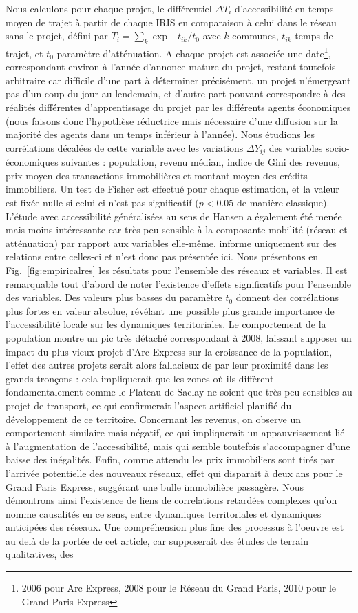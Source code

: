 {}{
Nous calculons pour chaque projet, le différentiel $\Delta T_i$ d'accessibilité en temps moyen de trajet à partir de chaque IRIS en comparaison à celui dans le réseau sans le projet, défini par $T_i = \sum_k \exp{-t_{ik}/t_0}$ avec $k$ communes, $t_{ik}$ temps de trajet, et $t_0$ paramètre d'atténuation. A chaque projet est associée une date\footnote{2006 pour Arc Express, 2008 pour le Réseau du Grand Paris, 2010 pour le Grand Paris Express}, correspondant environ à l'année d'annonce mature du projet, restant toutefois arbitraire car difficile d'une part à déterminer précisément, un projet n'émergeant pas d'un coup du jour au lendemain, et d'autre part pouvant correspondre à des réalités différentes d'apprentissage du projet par les différents agents économiques (nous faisons donc l'hypothèse réductrice mais nécessaire d'une diffusion sur la majorité des agents dans un temps inférieur à l'année). Nous étudions les corrélations décalées de cette variable avec les variations $\Delta Y_{ij}$ des variables socio-économiques suivantes : population, revenu médian, indice de Gini des revenus, prix moyen des transactions immobilières et montant moyen des crédits immobiliers. Un test de Fisher est effectué pour chaque estimation, et la valeur est fixée nulle si celui-ci n'est pas significatif ($p<0.05$ de manière classique). L'étude avec accessibilité généralisées au sens de Hansen a également été menée mais moins intéressante car très peu sensible à la composante mobilité (réseau et atténuation) par rapport aux variables elle-même, informe uniquement sur des relations entre celles-ci et n'est donc pas présentée ici. Nous présentons en Fig.~\ref{fig:empiricalres} les résultats pour l'ensemble des réseaux et variables. Il est remarquable tout d'abord de noter l'existence d'effets significatifs pour l'ensemble des variables. Des valeurs plus basses du paramètre $t_0$ donnent des corrélations plus fortes en valeur absolue, révélant une possible plus grande importance de l'accessibilité locale sur les dynamiques territoriales. Le comportement de la population montre un pic très détaché correspondant à 2008, laissant supposer un impact du plus vieux projet d'Arc Express sur la croissance de la population, l'effet des autres projets serait alors fallacieux de par leur proximité dans les grands tronçons : cela impliquerait que les zones où ils diffèrent fondamentalement comme le Plateau de Saclay ne soient que très peu sensibles au projet de transport, ce qui confirmerait l'aspect artificiel planifié du développement de ce territoire. Concernant les revenus, on observe un comportement similaire mais négatif, ce qui impliquerait un appauvrissement lié à l'augmentation de l'accessibilité, mais qui semble toutefois s'accompagner d'une baisse des inégalités. Enfin, comme attendu les prix immobiliers sont tirés par l'arrivée potentielle des nouveaux réseaux, effet qui disparait à deux ans pour le Grand Paris Express, suggérant une bulle immobilière passagère. Nous démontrons ainsi l'existence de liens de correlations retardées complexes qu'on nomme causalités en ce sens, entre dynamiques territoriales et dynamiques anticipées des réseaux. Une compréhension plus fine des processus à l'oeuvre est au delà de la portée de cet article, car supposerait des études de terrain qualitatives, des }
